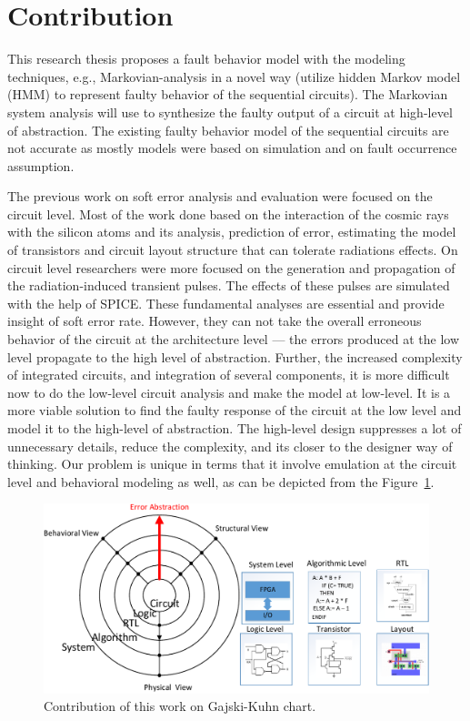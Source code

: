  

\section{Contribution}


This research thesis proposes a fault behavior model with the modeling techniques, e.g., Markovian-analysis in a novel way (utilize hidden Markov model (HMM) to represent faulty behavior of the sequential circuits). The Markovian system analysis will use to synthesize the faulty output of a circuit at high-level of abstraction. The existing faulty behavior model of the sequential circuits are not accurate as mostly models were based on simulation and on fault occurrence assumption. 

The previous work on soft error analysis and evaluation were focused on the circuit level. Most of the work done based on the interaction of the cosmic rays with the silicon atoms and its analysis, prediction of error, estimating the model of transistors and circuit layout structure that can tolerate radiations effects. On circuit level researchers were more focused on the generation and propagation of the radiation-induced transient pulses. The effects of these pulses are simulated with the help of SPICE. These fundamental analyses are essential and provide insight of soft error rate. However, they can not take the overall erroneous behavior of the circuit at the architecture level --- the errors produced at the low level propagate to the high level of abstraction. Further, the increased complexity of integrated circuits, and integration of several components, it is more difficult now to do the low-level circuit analysis and make the model at low-level. It is a more viable solution to find the faulty response of the circuit at the low level and model it to the high-level of abstraction. The high-level design suppresses a lot of unnecessary details, reduce the complexity, and its closer to the designer way of thinking. Our problem is unique in terms that it involve emulation at the circuit level and behavioral modeling as well, as can be depicted from the Figure~\ref{fig:ychart}.


\begin{figure}[tb!]

 \centering
  \captionsetup{justification=centering}    
   \includegraphics[scale=0.8]{Figures/ychart-block.pdf}
   \caption{Contribution of this work on Gajski-Kuhn chart.}
\label{fig:ychart}
\end{figure}



